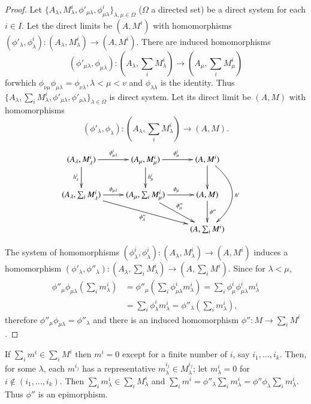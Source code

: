\begin{proof}
Let $\{ A_ \lambda,M^i_ \lambda, \phi'_{\mu \lambda},\phi^i_{\mu
  \lambda}\}_{\lambda ,\mu \in \Omega}$ ($\Omega$ a directed set) be a
direct system for each $i \in I$. Let the direct limits be $(A,M^i)$
with homomorphisms $(\phi'_\lambda , \phi^i_\lambda):(A_\lambda, M^i_
\lambda)\longrightarrow (A,M^i)$. There are induced homomorphisms 
$$
(\phi'_{\mu \lambda},\phi_{\mu \lambda}):(A_ \lambda ,\sum_i M^i_
\lambda)\to (A_ \mu,\sum_i M^i_ \mu) 
$$
for\pageoriginale which $\phi_{\nu\mu}\phi_{\mu \lambda}=\phi_{\nu
  \lambda},\lambda<\mu <v$ and $\phi_{\lambda \lambda}$ is the
identity. Thus $\{ A_ \lambda,\sum_i M^i_ \lambda, \phi'_{\mu
  \lambda}, \phi'_{\mu \lambda} \}_{\lambda \in \Omega}$ is direct
system. Let its direct limit be $(A,M)$ with homomorphisms 
$$
(\phi'_ \lambda, \phi_\lambda):(A_\lambda,\sum_i M^i_ \lambda) \to
(A,M). 
$$
\[
\xymatrix{
(A_{\lambda}, M^i_{\lambda}) \ar[r]^{\phi^i_{\mu\lambda}}
  \ar[d]_{h^i_{\lambda}} & (A_{\mu}, M^i_{\mu})
  \ar[r]^{\phi^i_{\mu}}\ar[d]^{h^i_{\mu}} & (A,M^i) \ar[d]
  \ar@/^2.5pc/[dd]^{h^i}& \\
(A_{\lambda}, \sum_i M^i_{\lambda}) \ar[r]^{\phi_{\mu\lambda}}
  \ar[drr]_{\phi''_{\lambda}} & (A_{\mu}, \sum_i M^i_{\mu})
  \ar[r]^{\phi_{\mu}} \ar[dr]^{\phi''_{\mu}}  & (A,M) \ar[d]^{\phi''}  & \\
& &  (A,\sum_i M^i) &
}
\]

The system of homomorphisms
$(\phi^i_\lambda,\phi^i_{\lambda}):(A_\lambda,M^i_\lambda)\to
(A,M^i)$ induces a 
homomorphism $(\phi'_\lambda, \phi''_\lambda):(A_\lambda, \sum_i
M^i_\lambda) \to (A,\sum_i M^i)$. Since for $\lambda < \mu$,  
\begin{align*}
\phi''_\mu \phi_{\mu \lambda}(\sum_i m^i_ \lambda) & = \phi''_ \mu (\sum_i 
\phi^i_{\mu \lambda}m^i_ \lambda)=\sum_i \phi^i_\mu \phi^i_{\mu
  \lambda}m^i_ \lambda\\ 
&=\sum_i\phi^i_ \lambda m^i_ \lambda=\phi''_ \lambda (\sum_i m^i_
\lambda), 
\end{align*}
therefore $\phi''_ \mu \phi_{\mu \lambda}= \phi''_ \lambda$ and there is 
an induced homomorphism $\phi'' :M \to \sum_i M^i$. 
\end{proof}

If $\sum_im^i \in \sum_i M^i$ then $m^i=0$ except for a finite number
of $i$, say $i_1, \ldots ,i_k$. Then, for some $\lambda$, each $m^{i_j}$
has a representative $m^{i_j}_\lambda \in M^{i_j}_\lambda$; let
$m^i_\lambda=0$ for $i \notin (i_1, \ldots,i_k)$. Then $\sum_i
m^i_\lambda \in \sum_iM^i_\lambda$ and $\sum_i m^i=\phi''_\lambda
\sum_i m^i_\lambda=\phi'' \phi_\lambda \sum_i m^i_\lambda$. Thus\pageoriginale
$\phi''$ is an epimorphism.  

